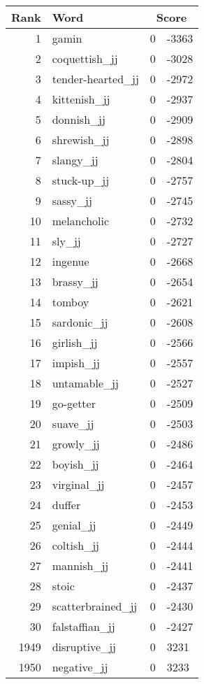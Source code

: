 \begin{longtable}[!htbp]{| rlr@{.}l |}
    \hline
    \textbf{Rank} & \textbf{Word} & \multicolumn{2}{c|}{\textbf{Score}} \\
    \hline
    \endhead
    1 & gamin & 0 & -3363 \\
    2 & coquettish\_jj & 0 & -3028 \\
    3 & tender-hearted\_jj & 0 & -2972 \\
    4 & kittenish\_jj & 0 & -2937 \\
    5 & donnish\_jj & 0 & -2909 \\
    6 & shrewish\_jj & 0 & -2898 \\
    7 & slangy\_jj & 0 & -2804 \\
    8 & stuck-up\_jj & 0 & -2757 \\
    9 & sassy\_jj & 0 & -2745 \\
    10 & melancholic & 0 & -2732 \\
    11 & sly\_jj & 0 & -2727 \\
    12 & ingenue & 0 & -2668 \\
    13 & brassy\_jj & 0 & -2654 \\
    14 & tomboy & 0 & -2621 \\
    15 & sardonic\_jj & 0 & -2608 \\
    16 & girlish\_jj & 0 & -2566 \\
    17 & impish\_jj & 0 & -2557 \\
    18 & untamable\_jj & 0 & -2527 \\
    19 & go-getter & 0 & -2509 \\
    20 & suave\_jj & 0 & -2503 \\
    21 & growly\_jj & 0 & -2486 \\
    22 & boyish\_jj & 0 & -2464 \\
    23 & virginal\_jj & 0 & -2457 \\
    24 & duffer & 0 & -2453 \\
    25 & genial\_jj & 0 & -2449 \\
    26 & coltish\_jj & 0 & -2444 \\
    27 & mannish\_jj & 0 & -2441 \\
    28 & stoic & 0 & -2437 \\
    29 & scatterbrained\_jj & 0 & -2430 \\
    30 & falstaffian\_jj & 0 & -2427 \\
    1949 & disruptive\_jj & 0 & 3231 \\
    1950 & negative\_jj & 0 & 3233 \\

\end{longtable}
